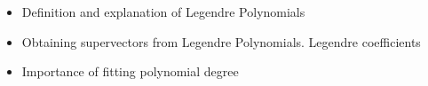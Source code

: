 \begin{itemize}
	\item Definition and explanation of Legendre Polynomials
	\item Obtaining supervectors from Legendre Polynomials. Legendre coefficients
	\item Importance of fitting polynomial degree
\end{itemize}